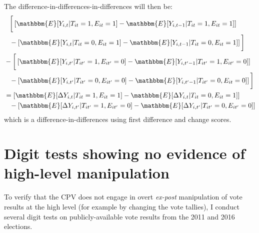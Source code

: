 \documentclass[12pt]{article}\usepackage[]{graphicx}\usepackage[]{color}
\newcommand{\1}{\mathbbm{1}}
\renewcommand\r{\right}
\renewcommand\l{\left}
\newcommand\E{\mathbbm{E}}
\begin{document}
The difference-in-differences-in-differences will then be:
	\begin{align*}
		&\phantom{=}\bigg[\l[\E[Y_{i,t} | T_{it}=1, E_{it}=1] - \E[Y_{i,t-1} | T_{it}=1, E_{it}=1]\r] \\
		&\phantom{=} - \l[\E[Y_{i,t} | T_{it}=0, E_{it}=1] - \E[Y_{i,t-1} | T_{it}=0, E_{it}=1]\r]\bigg] \\
		&- \bigg[\l[\E[Y_{i,t'} | T_{it'}=1, E_{it'}=0] - \E[Y_{i,t'-1} | T_{it'}=1, E_{it'}=0]\r] \\
		&\phantom{=} - \l[\E[Y_{i,t'} | T_{it'}=0, E_{it'}=0] - \E[Y_{i,t'-1} | T_{it'}=0, E_{it}=0]\r]\bigg] \\
		& = \l[\E[\Delta Y_{i,t} | T_{it}=1, E_{it}=1] - \E[\Delta Y_{i,t} | T_{it}=0, E_{it}=1]\r] \\
		&\phantom{=} - \l[\E[\Delta Y_{i,t'} | T_{it'}=1, E_{it'}=0] - \E[\Delta Y_{i,t'} | T_{it'}=0, E_{it'}=0]\r]
	\end{align*}	
which is a difference-in-differences using first difference and change scores.

\newpage
\section{Digit tests showing no evidence of high-level manipulation}
\label{app:benford}
To verify that the CPV does not engage in overt \textit{ex-post} manipulation of vote results at the high level (for example by changing the vote tallies), I conduct several digit tests on publicly-available vote results from the 2011 and 2016 elections. 
\end{document}
